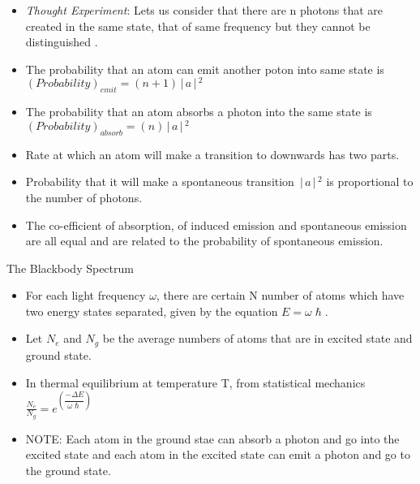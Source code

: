 \documentclass[aspectratio=169]{beamer}
\begin{document}
\begin{frame}
	\begin{itemize}
		\item \textit{Thought Experiment}: Lets us consider that there are n photons that are created in the same state, that of same frequency but they cannot be distinguished .\newline
		\item The probability that an atom can emit another poton into same state is \newline
		$(Probability)_{emit} = (n+1)\,\Bigr\rvert\,a \,\Bigr\rvert\,^{2}$  \newline
		\item The probability that an atom absorbs a photon into the same state is \newline
		$(Probability)_{absorb} = (n)\,\Bigr\rvert\, a\,\Bigr\rvert\,^{2}$
	\end{itemize}
\end{frame}

\begin{frame}
	\begin{itemize}
		\item Rate at which an atom will make a transition to downwards has two parts.\newline
		\item Probability that it will make a spontaneous transition $\,\Bigr\rvert\,a\,\Bigr\rvert\,^{2}$  is proportional to the number of photons. \newline
		\item The co-efficient of absorption, of induced emission and spontaneous emission are all equal and are related to the probability of spontaneous emission.
	\end{itemize}
\end{frame}

\begin{frame}{The Blackbody Spectrum}
	\begin{itemize}
	 \item For each light frequency $\omega$, there are certain N number of atoms which have two energy states separated, given by the equation $E = \omega\hslash$. \newline
	 \item Let $N_{e}$ and $N_{g}$ be the average numbers of atoms that are in excited state and ground state. \newline
	 \item In thermal equilibrium at temperature T, from statistical mechanics \newline
	 $\frac{N_{e}}{N_{g}} = e^{\left(\dfrac{-\Delta E}{\omega\hslash}\right)}$  \newline
	\item NOTE: Each atom in the ground stae can absorb a photon and go into the excited state and each atom in the excited state can emit a photon and go to the ground state.
	\end{itemize}
\end{frame} 
\end{document}
